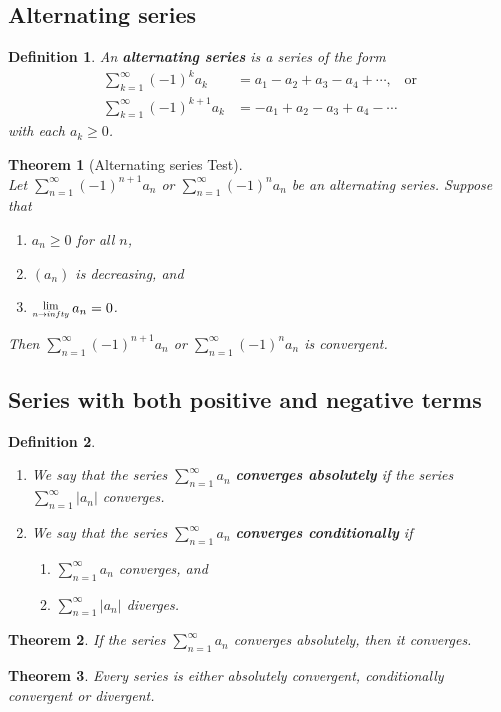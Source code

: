 \documentclass[12pt]{article}
\newcommand{\Lim}[1]{\raisebox{0.5ex}{\scalebox{0.8}{$\displaystyle \lim_{#1}\;$}}}
\newtheorem{definition}{Definition}[section]
\newtheorem{theorem}{Theorem}[section]
\theoremstyle{definition}
\begin{document}
\subsection{Alternating series}
\begin{definition}\normalfont An \textbf{alternating series} is a series of the form
\[
\begin{aligned}
\sum_{k=1}^\infty (-1)^k a_k&=a_1-a_2+a_3-a_4+\cdots,\;\;\;\text{or}\\
\sum_{k=1}^\infty (-1)^{k+1} a_k&=-a_1+a_2-a_3+a_4-\cdots
\end{aligned}
\]
with each $a_k\geq 0$.
\end{definition}
\begin{theorem}[Alternating series Test]
\hfill\\\normalfont Let $\sum_{n=1}^\infty (-1)^{n+1}a_n$ or $\sum_{n=1}^\infty (-1)^{n}a_n$ be an alternating series. Suppose that
\begin{enumerate}
\item $a_n\geq 0$ for all $n$,
\item $(a_n)$ is decreasing, and
\item $\Lim{n\to infty}a_n = 0$.
\end{enumerate}
Then $\sum_{n=1}^\infty (-1)^{n+1}a_n$ or $\sum_{n=1}^\infty (-1)^{n}a_n$ is convergent.
\end{theorem}
\subsection{Series with both positive and negative terms}
\begin{definition}\hfill\\\normalfont
\begin{enumerate}
\item We say that the series $\sum_{n=1}^\infty a_n$ \textbf{converges absolutely} if the series $\sum_{n=1}^\infty |a_n|$ converges.
\item We say that the series $\sum_{n=1}^\infty a_n$ \textbf{converges conditionally} if 
\begin{enumerate}
\item $\sum_{n=1}^\infty a_n$ converges, and
\item $\sum_{n=1}^\infty |a_n|$ diverges.
\end{enumerate}
\end{enumerate}
\end{definition}
\begin{theorem}\normalfont If the series $\sum_{n=1}^\infty a_n$ converges absolutely, then it converges.
\end{theorem}
\begin{theorem}\normalfont Every series is either absolutely convergent, conditionally convergent or divergent.
\end{theorem}
\end{document}
